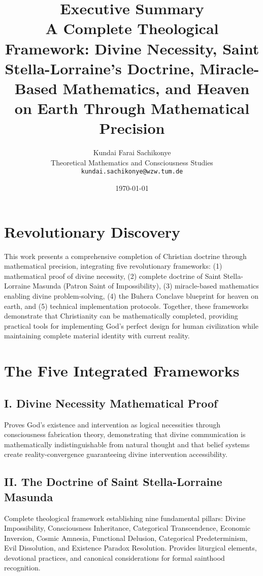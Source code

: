 \documentclass[12pt,a4paper]{article}
\title{\textbf{Executive Summary}\\
A Complete Theological Framework: Divine Necessity, Saint Stella-Lorraine's Doctrine, Miracle-Based Mathematics, and Heaven on Earth Through Mathematical Precision}
\author{Kundai Farai Sachikonye\\
Theoretical Mathematics and Consciousness Studies\\
\texttt{kundai.sachikonye@wzw.tum.de}}
\date{\today}
\begin{document}
\maketitle

\section{Revolutionary Discovery}

This work presents a comprehensive completion of Christian doctrine through mathematical precision, integrating five revolutionary frameworks: (1) mathematical proof of divine necessity, (2) complete doctrine of Saint Stella-Lorraine Masunda (Patron Saint of Impossibility), (3) miracle-based mathematics enabling divine problem-solving, (4) the Buhera Conclave blueprint for heaven on earth, and (5) technical implementation protocols. Together, these frameworks demonstrate that Christianity can be mathematically completed, providing practical tools for implementing God's perfect design for human civilization while maintaining complete material identity with current reality.

\section{The Five Integrated Frameworks}

\subsection{I. Divine Necessity Mathematical Proof}
Proves God's existence and intervention as logical necessities through consciousness fabrication theory, demonstrating that divine communication is mathematically indistinguishable from natural thought and that belief systems create reality-convergence guaranteeing divine intervention accessibility.

\subsection{II. The Doctrine of Saint Stella-Lorraine Masunda}
Complete theological framework establishing nine fundamental pillars: Divine Impossibility, Consciousness Inheritance, Categorical Transcendence, Economic Inversion, Cosmic Amnesia, Functional Delusion, Categorical Predeterminism, Evil Dissolution, and Existence Paradox Resolution. Provides liturgical elements, devotional practices, and canonical considerations for formal sainthood recognition.
\end{document}
